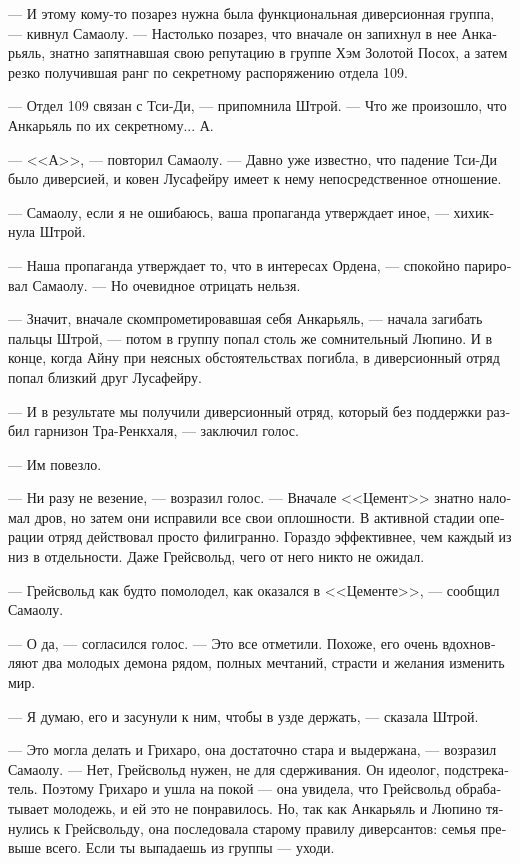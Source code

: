 \documentclass[a4paper,12pt,fleqn]{book}\usepackage{cooltooltips}\usepackage{polyglossia}\setdefaultlanguage[babelshorthands=true]{russian}\setotherlanguage{english}\defaultfontfeatures{Ligatures=TeX,Mapping=tex-text} \usepackage{xcolor}\definecolor{lightgray}{HTML}{bbbbbb}\color{lightgray}\newcommand{\ml}[3]{\textenglish{\textcolor{black}{#3}}}
\begin{document}
{--- И этому кому-то позарез нужна была функциональная диверсионная группа, --- кивнул Самаолу.
--- Настолько позарез, что вначале он запихнул в нее Анкарьяль, знатно запятнавшая свою репутацию в группе Хэм Золотой Посох, а затем резко получившая ранг по секретному распоряжению отдела 109.

--- Отдел 109 связан с Тси-Ди, --- припомнила Штрой.
--- Что же произошло, что Анкарьяль по их секретному...
А.

--- <<А>>, --- повторил Самаолу.
--- Давно уже известно, что падение Тси-Ди было диверсией, и ковен Лусафейру имеет к нему непосредственное отношение.

--- Самаолу, если я не ошибаюсь, ваша пропаганда утверждает иное, --- хихикнула Штрой.

--- Наша пропаганда утверждает то, что в интересах Ордена, --- спокойно парировал Самаолу.
--- Но очевидное отрицать нельзя.

--- Значит, вначале скомпрометировавшая себя Анкарьяль, --- начала загибать пальцы Штрой, --- потом в группу попал столь же сомнительный Люпино.
И в конце, когда Айну при неясных обстоятельствах погибла, в диверсионный отряд попал близкий друг Лусафейру.

--- И в результате мы получили диверсионный отряд, который без поддержки разбил гарнизон Тра-Ренкхаля, --- заключил голос.

--- Им повезло.

--- Ни разу не везение, --- возразил голос.
--- Вначале <<Цемент>> знатно наломал дров, но затем они исправили все свои оплошности.
В активной стадии операции отряд действовал просто филигранно.
Гораздо эффективнее, чем каждый из низ в отдельности.
Даже Грейсвольд, чего от него никто не ожидал.

--- Грейсвольд как будто помолодел, как оказался в <<Цементе>>, --- сообщил Самаолу.

--- О да, --- согласился голос.
--- Это все отметили.
Похоже, его очень вдохновляют два молодых демона рядом, полных мечтаний, страсти и желания изменить мир.

--- Я думаю, его и засунули к ним, чтобы в узде держать, --- сказала Штрой.

--- Это могла делать и Грихаро, она достаточно стара и выдержана, --- возразил Самаолу.
--- Нет, Грейсвольд нужен, не для сдерживания. 
Он идеолог, подстрекатель.
Поэтому Грихаро и ушла на покой --- она увидела, что Грейсвольд обрабатывает молодежь, и ей это не понравилось.
Но, так как Анкарьяль и Люпино тянулись к Грейсвольду, она последовала старому правилу диверсантов: семья превыше всего.
Если ты выпадаешь из группы --- уходи.

}
\end{document}
